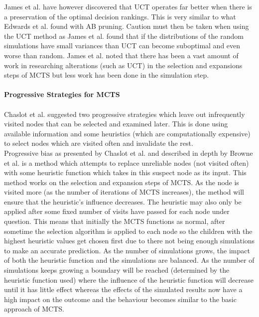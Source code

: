 \documentclass [11pt]{article}
\begin{document}
	\noindent James et al. \cite{wits} have however discovered that UCT operates far better when there is a preservation of the optimal decision rankings. This is very similar to what Edwards et al. \cite{AIM030} found with AB pruning. Caution must then be taken when using the UCT method as James et al. \cite{wits} found that if the distributions of the random simulations have small variances than UCT can become suboptimal and even worse than random. James et al. \cite{wits} noted that there has been a vast amount of work in researching alterations (such as UCT) in the selection and expansions steps of MCTS but less work has been done in the simulation step. 
	\\\\
	\noindent \textbf{Progressive Strategies for MCTS}\\\\
	\noindent Chaslot et al. \cite{progressive} suggested two progressive strategies which leave out infrequently visited nodes that can be selected and examined later. This is done using available information and some heuristics (which are computationally expensive) to select nodes which are visited often and invalidate the rest.\\
	
	\noindent Progressive bias as presented by Chaslot et al. \cite{progressive} and described in depth by Browne et al. \cite{survey} is a method which attempts to replace unreliable nodes (not visited often) with some heuristic function which takes in this suspect node as its input. This method works on the selection and expansion steps of MCTS. As the node is visited more (as the number of iterations of MCTS increases), the method will ensure that the heuristic's influence decreases. The heuristic may also only be applied after some fixed number of visits have passed for each node under question. This means that initially the MCTS functions as normal, after sometime the selection algorithm is applied to each node so the children with the highest heuristic values get chosen first due to there not being enough simulations to make an accurate prediction. As the number of simulations grows, the impact of both the heuristic function and the simulations are balanced. As the number of simulations keeps growing a boundary will be reached (determined by
	the heuristic function used) where the influence of the heuristic function will decrease until it has little effect whereas the effects of the simulated results now have a high impact on the outcome and the behaviour becomes similar to the basic approach of MCTS. \\
	
\end{document}
